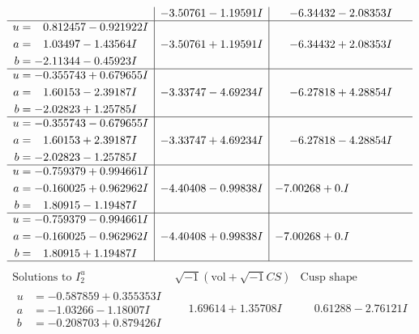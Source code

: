 \documentclass[1p]{elsarticle_modified}
\theoremstyle{definition}
\newcommand{\I}{\sqrt{-1}}
\begin{document}
$$\begin{array}{c|c|c}
 & -3.50761 - 1.19591 I & -6.34432 - 2.08353 I \\ \hline\begin{aligned}
u &= \phantom{-}0.812457 - 0.921922 I \\
a &= \phantom{-}1.03497 - 1.43564 I \\
b &= -2.11344 - 0.45923 I\end{aligned}
 & -3.50761 + 1.19591 I & -6.34432 + 2.08353 I \\ \hline\begin{aligned}
u &= -0.355743 + 0.679655 I \\
a &= \phantom{-}1.60153 - 2.39187 I \\
b &= -2.02823 + 1.25785 I\end{aligned}
 & -3.33747 - 4.69234 I & -6.27818 + 4.28854 I \\ \hline\begin{aligned}
u &= -0.355743 - 0.679655 I \\
a &= \phantom{-}1.60153 + 2.39187 I \\
b &= -2.02823 - 1.25785 I\end{aligned}
 & -3.33747 + 4.69234 I & -6.27818 - 4.28854 I \\ \hline\begin{aligned}
u &= -0.759379 + 0.994661 I \\
a &= -0.160025 + 0.962962 I \\
b &= \phantom{-}1.80915 - 1.19487 I\end{aligned}
 & -4.40408 - 0.99838 I & -7.00268 + 0. I\phantom{ +0.000000I} \\ \hline\begin{aligned}
u &= -0.759379 - 0.994661 I \\
a &= -0.160025 - 0.962962 I \\
b &= \phantom{-}1.80915 + 1.19487 I\end{aligned}
 & -4.40408 + 0.99838 I & -7.00268 + 0. I\phantom{ +0.000000I}\\
 \hline 
 \end{array}$$\newpage$$\begin{array}{c|c|c}  
\text{Solutions to }I^u_{2}& \I (\text{vol} + \sqrt{-1}CS) & \text{Cusp shape}\\
 \hline 
\begin{aligned}
u &= -0.587859 + 0.355353 I \\
a &= -1.03266 - 1.18007 I \\
b &= -0.208703 + 0.879426 I\end{aligned}
 & \phantom{-}1.69614 + 1.35708 I & \phantom{-}0.61288 - 2.76121 I \\ \hline\begin{aligned}

\end{aligned}
\end{array}$$
\end{document}
